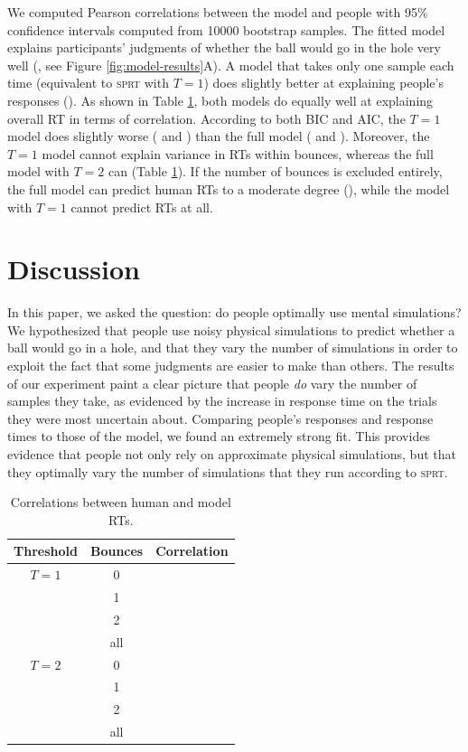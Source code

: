 \documentclass[10pt,letterpaper]{article}
\begin{document}
We computed Pearson correlations between the model and people with 95\% confidence intervals computed from 10000 bootstrap samples. The fitted model explains participants' judgments of whether the ball would go in the hole very well (\HoleResponseCorr{}, see Figure \ref{fig:model-results}A).
A model that takes only one sample each time (equivalent to \textsc{sprt} with $T=1$) does slightly better at explaining people's responses (\RawHoleResponseCorr{}).
As shown in Table \ref{tbl:rt}, both models do equally well at explaining overall RT in terms of correlation.
According to both BIC and AIC, the $T=1$ model does slightly worse (\BicNoSamples{} and \AicNoSamples{}) than the full model (\BicFull{} and \AicFull{}).
Moreover, the $T=1$ model cannot explain variance in RTs within bounces, whereas the full model with $T=2$ can (Table \ref{tbl:rt}).
If the number of bounces is excluded entirely, the full model can predict human RTs to a moderate degree (\NoBouncesHoleRTCorr{}), while the model with $T=1$ cannot predict RTs at all.

\section{Discussion}

In this paper, we asked the question: do people optimally use mental simulations?
We hypothesized that people use noisy physical simulations to predict whether a ball would go in a hole, and that they vary the number of simulations in order to exploit the fact that some judgments are easier to make than others.
The results of our experiment paint a clear picture that people \emph{do} vary the number of samples they take, as evidenced by the increase in response time on the trials they were most uncertain about.
Comparing people's responses and response times to those of the model, we found an extremely strong fit.
This provides evidence that people not only rely on approximate physical simulations, but that they optimally vary the number of simulations that they run according to \textsc{sprt}.

\begin{table}
    \begin{tabular}{ccl}
    \toprule
    \textbf{Threshold} & \textbf{Bounces} & \textbf{Correlation} \\
    \midrule
    $T=1$ & 0   & \NoSamplesHoleRTCorrZeroBounces{} \\
          & 1   & \NoSamplesHoleRTCorrOneBounce{} \\
          & 2   & \NoSamplesHoleRTCorrTwoBounces{} \\
          & all & \NoSamplesHoleRTCorr{} \\
    \midrule
    $T=2$ & 0   & \HoleRTCorrZeroBounces{} \\
          & 1   & \HoleRTCorrOneBounce{} \\
          & 2   & \HoleRTCorrTwoBounces{} \\
          & all & \HoleRTCorr{} \\
    \bottomrule
    \end{tabular}
    \caption{Correlations between human and model RTs.}
    \label{tbl:rt}
\end{table}
\end{document}
